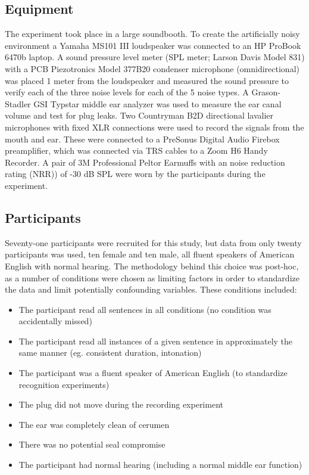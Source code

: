   
\subsection{Equipment}

The experiment took place in a large soundbooth.  To create the artificially noisy environment a Yamaha MS101 III loudspeaker was connected to an HP ProBook 6470b laptop.  A sound pressure level meter (SPL meter; Larson Davis Model 831) with a PCB Piezotronics Model 377B20 condenser microphone (omnidirectional) was placed 1 meter from the loudspeaker and measured the sound pressure to verify each of the three noise levels for each of the 5 noise types. A Grason-Stadler GSI Typstar middle ear analyzer was used to measure the ear canal volume and test for plug leaks.  Two Countryman B2D directional lavalier microphones with fixed XLR connections were used to record the signals from the mouth and ear.  These were connected to a PreSonus Digital Audio Firebox preamplifier, which was connected via TRS cables to a Zoom H6 Handy Recorder. A pair of 3M Professional Peltor Earmuffs with an noise reduction rating (NRR)) of -30 dB SPL were worn by the participants during the experiment.


\subsection{Participants}\label{chap2:methods:participants}
Seventy-one participants were recruited for this study, but data from only twenty participants was used, ten female and ten male, all fluent speakers of American English with normal hearing.  The methodology behind this choice was post-hoc, as a number of conditions were chosen as limiting factors in order to standardize the data and limit potentially confounding variables.  These conditions included:

\begin{itemize}
\item{The participant read all sentences in all conditions (no condition was accidentally missed)}
\item{The participant read all instances of a given sentence in approximately the same manner (eg. consistent duration, intonation)}
\item{The participant was a fluent speaker of American English (to standardize recognition experiments)}
\item{The plug did not move during the recording experiment}
\item{The ear was completely clean of cerumen}
\item{There was no potential seal compromise}
\item{The participant had normal hearing (including a normal middle ear function)}
\end{itemize}

